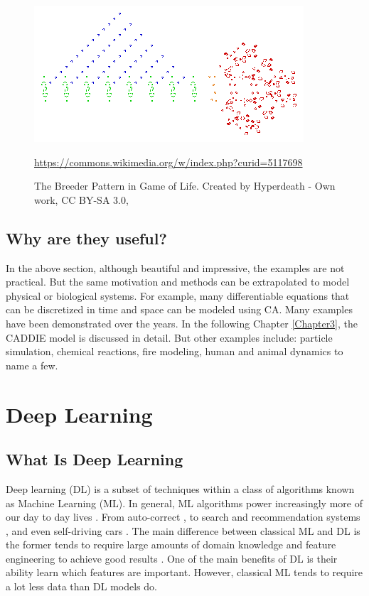 \begin{figure}[tbph]
	\centering
	\includegraphics[width=0.8\linewidth, height=0.3\textheight]{Figures/Conways_game_of_life_breeder}
	\caption[Example Game Of Life Pattern (Breeder)]{The Breeder Pattern in Game of Life. Created by Hyperdeath - Own work, CC BY-SA 3.0, }
	\label{fig:breeder}
	\url{https://commons.wikimedia.org/w/index.php?curid=5117698}
\end{figure}


\subsection{Why are they useful?}
In the above section, although beautiful and impressive, the examples are not practical. But the same motivation and methods can be extrapolated to model physical or biological systems. For example, many differentiable equations that can be discretized in time and space can be modeled using CA. Many examples have been demonstrated over the years. In the following Chapter \ref{Chapter3}, the CADDIE model is discussed in detail. But other examples include: particle simulation, chemical reactions, fire modeling, human and animal dynamics \cite{karafyllidis1997model, kier2005modeling, wolf2004lattice, alizadeh2011dynamic} to name a few.

\section{Deep Learning}
\subsection{What Is Deep Learning}
Deep learning (DL) is a subset of techniques within a class of algorithms known as Machine Learning (ML). In general, ML algorithms power increasingly more of our day to day lives \cite{lecun2015deep}. From auto-correct \cite{etoori2018automatic}, to search and recommendation systems \cite{haldar2019applying}, and even self-driving cars \cite{gupta2021deep}. The main difference between classical ML and DL is the former tends to require large amounts of domain knowledge and feature engineering to achieve good results \cite{dargan2020survey}. One of the main benefits of DL is their ability learn which features are important. However, classical ML tends to require a lot less data than DL models do. \\

